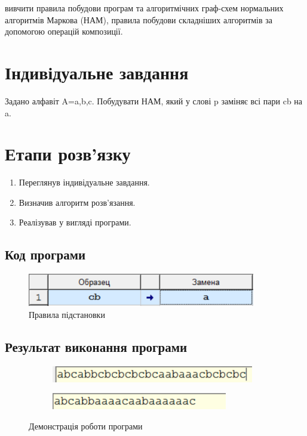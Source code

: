 \documentclass[a4paper, 12pt, oneside]{extarticle}
\begin{document}
\Margins



вивчити правила побудови програм та алгоритмічних
граф-схем нормальних алгоритмів Маркова (НАМ), правила побудови
складніших алгоритмів за допомогою операцій композиції.

\section*{Індивідуальне завдання}

Задано алфавіт A={a,b,c}. Побудувати НАМ, який у слові p заміняє всі
пари cb на a.

\section*{Етапи розв'язку}

\begin{enumerate}
		\item Переглянув індивідуальне завдання.
		\item Визначив алгоритм розв'язання.
		\item Реалізував у вигляді програми.
\end{enumerate}

\subsection*{Код програми}

\begin{figure}[h]
	\centering
	\includegraphics[width=.5\textwidth]{commands.png}
	\caption{Правила підстановки}
\end{figure}

\subsection*{Результат виконання програми}

\begin{figure}[h]
	\begin{subfigure}{.5\textwidth}
		\centering
		\includegraphics[width=.8\textwidth]{in.png}
	\end{subfigure}
	\hfill
	\begin{subfigure}{.5\textwidth}
		\centering
		\includegraphics[width=.8\textwidth]{out.png}
	\end{subfigure}
	\caption{Демонстрація роботи програми}
\end{figure}
\end{document}
